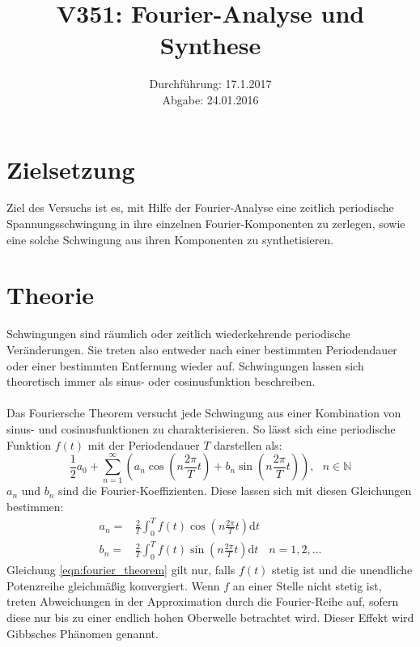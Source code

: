 \documentclass[
  bibliography=totoc,     %
  captions=tableheading,  %
  titlepage=firstiscover, %
]{scrartcl}
\title{V351: Fourier-Analyse und Synthese}
\author{
  Simon Schulte
  \texorpdfstring{
    \\
    \href{mailto:simon.schulte@udo.edu}{simon.schulte@udo.edu}
  }{}
  \texorpdfstring{\and}{, }
  Tim Sedlaczek
  \texorpdfstring{
    \\
    \href{mailto:tim.sedlaczek@udo.edu}{tim.sedlaczek@udo.edu}
  }{}
}
\date{Durchführung: 17.1.2017\\
      Abgabe: 24.01.2016}
\begin{document}
\maketitle
\thispagestyle{empty}
\tableofcontents
\newpage
\section{Zielsetzung}
\label{sec:zielsetzung}
Ziel des Versuchs ist es, mit Hilfe der Fourier-Analyse eine zeitlich periodische
Spannungsschwingung in ihre einzelnen Fourier-Komponenten zu zerlegen, sowie
eine solche Schwingung aus ihren Komponenten zu synthetisieren.
\section{Theorie}
\label{sec:theorie}
Schwingungen sind räumlich oder zeitlich wiederkehrende periodische Veränderungen.
Sie treten also entweder nach einer bestimmten Periodendauer oder einer
bestimmten Entfernung wieder auf. Schwingungen lassen sich theoretisch immer
als sinus- oder cosinusfunktion beschreiben. \\
\\
Das Fouriersche Theorem versucht jede Schwingung aus einer Kombination von
sinus- und cosinusfunktionen zu charakterisieren. So lässt sich eine periodische
Funktion $f(t)$ mit der Periodendauer $T$ darstellen als:
\begin{equation}
	\frac{1}{2}a_0+\sum_{n=1}^{\infty}\left(a_n\cos\left(n\frac{2\pi}{T}t\right)+b_n\sin\left(n\frac{2\pi}{T}t\right)\right),\:\:\:n\in\mathbb{N}
	\label{eqn:fourier_theorem}
\end{equation}
$a_n$ und $b_n$ sind die Fourier-Koeffizienten. Diese lassen sich mit diesen
Gleichungen bestimmen:
\begin{align}
	a_n=&\frac{2}{T}\int_0^T f(t)\cos\left(n\frac{2\pi}{T}t\right)\mathup{d}t&\\
	b_n=&\frac{2}{T}\int_0^T f(t)\sin\left(n\frac{2\pi}{T}t\right)\mathup{d}t&n=1,2,\ldots
	\label{eqn:fourier_koeffizienten}
\end{align}
Gleichung \eqref{eqn:fourier_theorem} gilt nur, falls $f(t)$ stetig ist und die
unendliche Potenzreihe gleichmäßig konvergiert. Wenn $f$ an einer Stelle nicht
stetig ist, treten Abweichungen in der Approximation durch die Fourier-Reihe
auf, sofern diese nur bis zu einer endlich hohen Oberwelle betrachtet wird.
Dieser Effekt wird Gibbsches Phänomen genannt.
\end{document}

